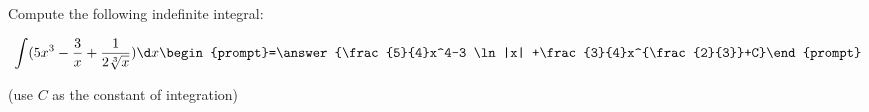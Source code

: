 \documentclass[handout]{ximera}
\author{Jim Talamo}
\begin{document}
\begin{exercise}
Compute the following indefinite integral: 

\[
\int (5x^3-\frac{3}{x}+\frac{1}{2 \sqrt[3]{x}} ) \d x 
\begin{prompt}=\answer{\frac{5}{4}x^4-3 \ln |x| +\frac{3}{4}x^{\frac{2}{3}}+C}\end{prompt}
\]
\begin{prompt} (use $C$ as the constant of integration) \end{prompt}
\end{exercise}
\end{document}
